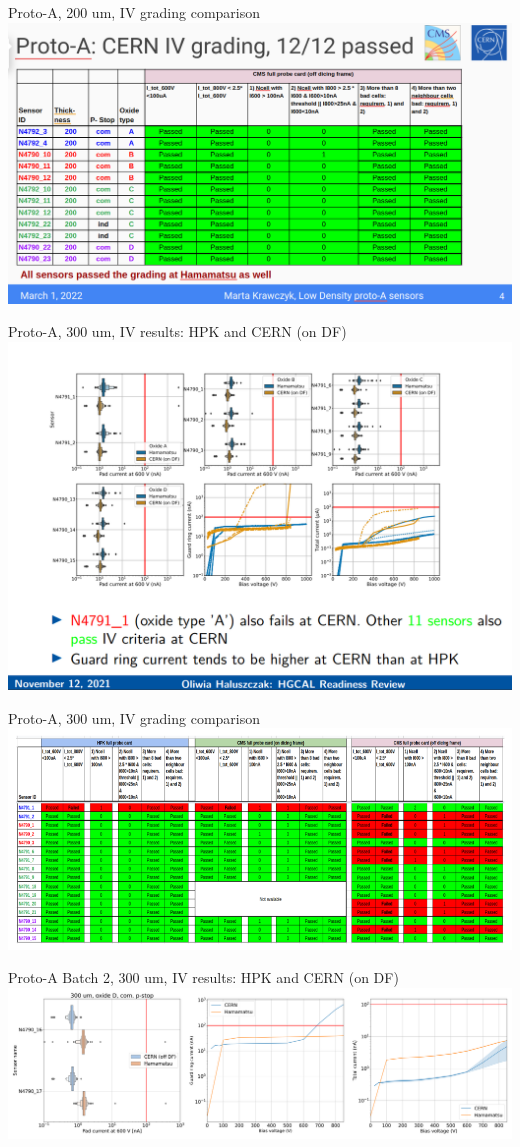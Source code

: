 \documentclass{beamer}
\begin{document}
\begin{frame}{Proto-A, 200 um, IV grading comparison}
  \includegraphics[width=.8\textwidth]{plots/IV_CERN_HPK_200um.png}
\end{frame}

\begin{frame}{Proto-A, 300 um, IV results: HPK and CERN (on DF)}
  \includegraphics[width=.8\textwidth]{plots/IV_CERN_HPK_300um.png}
\end{frame}

\begin{frame}{Proto-A, 300 um, IV grading comparison}
  \includegraphics[width=.8\textwidth]{plots/IV_grading_300um.png}
\end{frame}

\begin{frame}{Proto-A Batch 2, 300 um, IV results: HPK and CERN (on DF)}
  \includegraphics[width=.8\textwidth]{plots/IV_Comparison_SensorsHPK_300um.png}
\end{frame}
\end{document}

